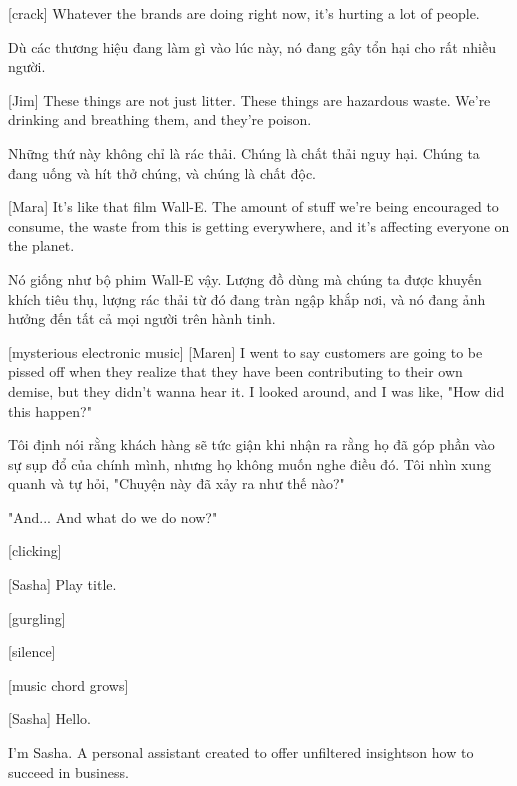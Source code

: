 \documentclass[a4paper]{article}
\begin{document}
	[crack]
	Whatever the brands are doing right now, it's hurting a lot of people.
	
	\begin{vietnamese-v2}
		[Bể nứt]
		
		Dù các thương hiệu đang làm gì vào lúc này, nó đang gây tổn hại cho rất nhiều người.
	\end{vietnamese-v2}
	
	[Jim] These things are not just litter. These things are hazardous waste. We're drinking and breathing them, and they're poison.

	\begin{vietnamese-v2}
		[Jim] Những thứ này không chỉ là rác thải. Chúng là chất thải nguy hại. Chúng ta đang uống và hít thở chúng, và chúng là chất độc.
	\end{vietnamese-v2}
	
	[Mara] It's like that film Wall-E. The amount of stuff we're being encouraged to consume, the waste from this is getting everywhere, and it's affecting everyone on the planet.
	
	\begin{vietnamese-v2}
		[Mara] Nó giống như bộ phim Wall-E vậy. Lượng đồ dùng mà chúng ta được khuyến khích tiêu thụ, lượng rác thải từ đó đang tràn ngập khắp nơi, và nó đang ảnh hưởng đến tất cả mọi người trên hành tinh.
	\end{vietnamese-v2}
	
	[mysterious electronic music]
	[Maren] I went to say customers are going to be pissed off when they realize that they have been contributing to their own demise, but they didn't wanna hear it. I looked around, and I was like, "How did this happen?" 
	
	\begin{vietnamese-v2}
		[Maren] Tôi định nói rằng khách hàng sẽ tức giận khi nhận ra rằng họ đã góp phần vào sự sụp đổ của chính mình, nhưng họ không muốn nghe điều đó. Tôi nhìn xung quanh và tự hỏi, "Chuyện này đã xảy ra như thế nào?"
	\end{vietnamese-v2}
	
	"And... And what do we do now?"
	
	[clicking]
	
	[Sasha] Play title.
	
	[gurgling]
	
	[silence]
	
	[music chord grows]
	
	[Sasha] Hello.
	
	I'm Sasha. A personal assistant created to offer unfiltered insights\footnotemark[5] on how to succeed in business.
	
\end{document}

